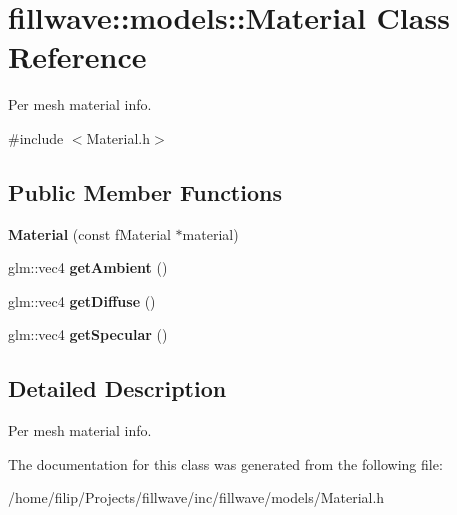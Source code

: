 \hypertarget{classfillwave_1_1models_1_1Material}{}\section{fillwave\+:\+:models\+:\+:Material Class Reference}
\label{classfillwave_1_1models_1_1Material}


Per mesh material info.  




{\ttfamily \#include $<$Material.\+h$>$}

\subsection*{Public Member Functions}
\begin{DoxyCompactItemize}
\item 
\hypertarget{classfillwave_1_1models_1_1Material_a4dbd7486f1d41540f7fd1592765765d0}{}{\bfseries Material} (const f\+Material $\ast$material)\label{classfillwave_1_1models_1_1Material_a4dbd7486f1d41540f7fd1592765765d0}

\item 
\hypertarget{classfillwave_1_1models_1_1Material_aac031db0c9f5d1ab1c37118663a498ac}{}glm\+::vec4 {\bfseries get\+Ambient} ()\label{classfillwave_1_1models_1_1Material_aac031db0c9f5d1ab1c37118663a498ac}

\item 
\hypertarget{classfillwave_1_1models_1_1Material_a2b71ceb7691cd4a381b3f12d98faa3ab}{}glm\+::vec4 {\bfseries get\+Diffuse} ()\label{classfillwave_1_1models_1_1Material_a2b71ceb7691cd4a381b3f12d98faa3ab}

\item 
\hypertarget{classfillwave_1_1models_1_1Material_a56e4999872ffccf557a97b3f27bff019}{}glm\+::vec4 {\bfseries get\+Specular} ()\label{classfillwave_1_1models_1_1Material_a56e4999872ffccf557a97b3f27bff019}

\end{DoxyCompactItemize}


\subsection{Detailed Description}
Per mesh material info. 

The documentation for this class was generated from the following file\+:\begin{DoxyCompactItemize}
\item 
/home/filip/\+Projects/fillwave/inc/fillwave/models/Material.\+h\end{DoxyCompactItemize}
